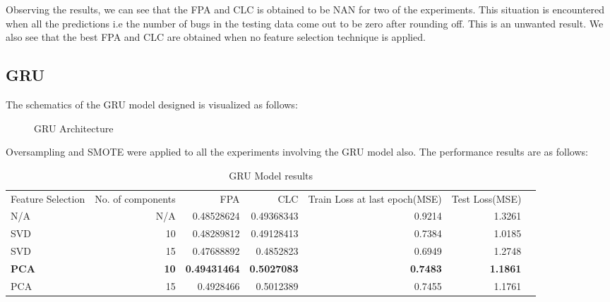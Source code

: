 Observing the results, we can see that the FPA and CLC is obtained to be NAN for two of the experiments. This situation is encountered when all the predictions i.e the number of bugs in the testing data come out to be zero after rounding off. This is an unwanted result. We also see that the best FPA and CLC are obtained when no feature selection technique is applied.

\subsection{GRU}
The schematics of the GRU model designed is visualized as follows:

\begin{figure}
%
  \caption{GRU Architecture}
  \label{fig:key}
\end{figure}

Oversampling and SMOTE were applied to all the experiments involving the GRU model also. The performance results are as follows:
 
\begin{table}[!htp]\centering
\caption{GRU Model results}\label{tab: }
\scriptsize
\begin{tabular}{lrrrrrr}\toprule
Feature Selection &No. of components &FPA &CLC &Train Loss at last epoch(MSE) &Test Loss(MSE) \\
N/A &N/A &0.48528624 &0.49368343 &0.9214 &1.3261 \\\midrule
SVD &10 &0.48289812 &0.49128413 &0.7384 &1.0185 \\
SVD &15 &0.47688892 &0.4852823 &0.6949 &1.2748 \\
\textbf{PCA} &\textbf{10} &\textbf{0.49431464} &\textbf{0.5027083} &\textbf{0.7483} &\textbf{1.1861} \\
PCA &15 &0.4928466 &0.5012389 &0.7455 &1.1761 \\
\bottomrule
\end{tabular}
\end{table}
 
